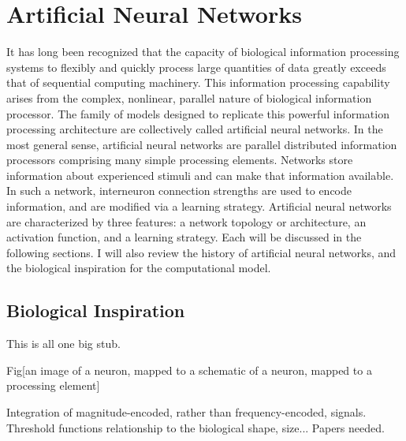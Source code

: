 \documentclass[11pt]{afthesis}
\begin{document}
	\section{Artificial Neural Networks}
	
	
	
	It has long been recognized that the capacity of biological information processing systems to flexibly and quickly process large quantities of data greatly exceeds that of sequential computing machinery. This information processing capability arises from the complex, nonlinear, parallel nature of biological information processor. The family of models designed to replicate this powerful information processing architecture are collectively called artificial neural networks. In the most general sense, artificial neural networks are parallel distributed information processors \cite{haykin1999} comprising many simple processing elements. Networks store information about experienced stimuli and can make that information available. In such a network, interneuron connection strengths are used to encode information, and are modified via a learning strategy. Artificial neural networks are characterized by three features: a network topology or architecture, an activation function, and a learning strategy. Each will be discussed in the following sections. I will also review the history of artificial neural networks, and the biological inspiration for the computational model.
	
	\subsection{Biological Inspiration}
	
	This is all one big stub.
	
	Fig[an image of a neuron, mapped to a schematic of a neuron, mapped to a processing element]
	
	Integration of magnitude-encoded, rather than frequency-encoded, signals. 
	Threshold functions relationship to the biological shape, size... Papers needed.
	
\end{document}
